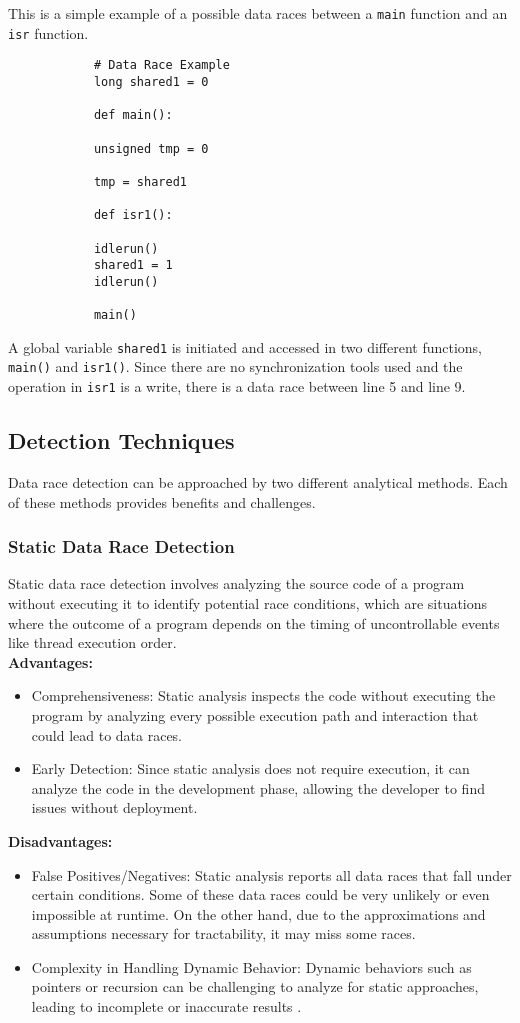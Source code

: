 \documentclass[
fancyheadings, %
%
%
]{stsreprt}
\begin{document}
{		This is a simple example of a possible data races between a \texttt{main} function and an \texttt{isr} function.
		\begin{lstlisting}
			# Data Race Example
			long shared1 = 0
			
			def main():
			
			unsigned tmp = 0
			
			tmp = shared1
			
			def isr1():
			
			idlerun()
			shared1 = 1
			idlerun()
			
			main()
		\end{lstlisting}
			
		
		A global variable \texttt{shared1} is initiated and accessed in two different functions, \texttt{main()} and \texttt{isr1()}. Since there are no synchronization tools used and the operation in \texttt{isr1} is a write, there is a data race between line 5 and line 9.
		
		\subsection{Detection Techniques}
		
		Data race detection can be approached by two different analytical methods. Each of these methods provides benefits and challenges.
		
		\subsubsection{Static Data Race Detection}
		Static data race detection involves analyzing the source code of a program without executing it to identify potential race conditions, which are situations where the outcome of a program depends on the timing of uncontrollable events like thread execution order. \\
		\textbf{Advantages:}
		\begin{itemize}
			\item Comprehensiveness: Static analysis inspects the code without executing the program by analyzing every possible execution path and interaction that could lead to data races.
			\item Early Detection: Since static analysis does not require execution, it can analyze the code in the development phase, allowing the developer to find issues without deployment.
		\end{itemize}
		\textbf{Disadvantages:}
		\begin{itemize}
			\item False Positives/Negatives: Static analysis reports all data races that fall under certain conditions. Some of these data races could be very unlikely or even impossible at runtime. On the other hand, due to the approximations and assumptions necessary for tractability, it may miss some races.
			\item Complexity in Handling Dynamic Behavior: Dynamic behaviors such as pointers or recursion can be challenging to analyze for static approaches, leading to incomplete or inaccurate results \cite{wang2020}.
		\end{itemize}
		
}
\end{document}

